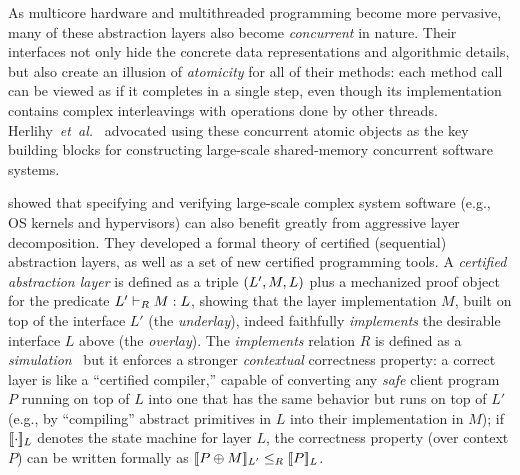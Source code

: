 As multicore hardware and multithreaded programming become more
pervasive, many of these abstraction layers also become {\em
  concurrent} in nature.  Their interfaces not only hide the concrete
data representations and algorithmic details, but also create an
illusion of {\em atomicity} for all of their methods: each method call
can be viewed as if it completes in a single step, even though its
implementation contains complex interleavings with operations done by
other threads.  Herlihy~{\em{}et~al.}~\cite{herlihy90,Herlihy08book}
advocated using these concurrent atomic objects as the key building
blocks for constructing large-scale shared-memory concurrent software
systems.

\citet{dscal15} showed that specifying and verifying large-scale
complex system software (e.g., OS kernels and hypervisors) can also
benefit greatly from aggressive layer decomposition. They developed a
formal theory of certified (sequential) abstraction layers, as well as a
set of new certified programming tools.  A {\em certified abstraction
  layer} is defined as a triple $\layer{L'}{M}{L}$ plus a mechanized
proof object for the predicate $\ltyp{L'}{R}{M}{L}$, showing that the layer
implementation $M$, built on top of the interface $L'$ (the {\em
  underlay}), indeed faithfully {\em implements} the desirable
interface $L$ above (the {\em overlay}).  The {\em implements}
relation $R$ is defined as a {\em simulation}~\cite{Lynch95} but it
enforces a stronger {\em contextual} correctness property: a correct
layer is like a ``certified compiler,'' capable of converting any {\em
  safe} client program $P$ running on top of $L$ into one that has the
same behavior but runs on top of $L'$ (e.g., by ``compiling'' abstract
primitives in $L$ into their implementation in $M$); if
$\sem{L}{\cdot}$ denotes the state machine for layer $L$, the
correctness property (over context $P$) can be written formally as
$\sem{L'}{P\oplus{}M} \leq_R \sem{L}{P}$.

